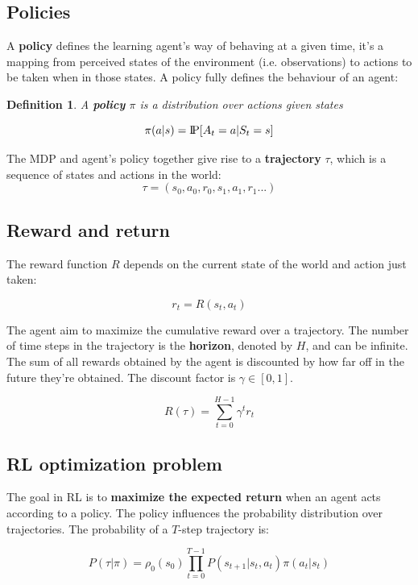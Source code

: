 \documentclass{article}
\newtheorem{definition}{Definition}
\newcommand{\Pprob}{\text{I\kern-0.15em P}}
\begin{document}
\subsection{Policies}
A \textbf{policy} defines the learning agent’s way of behaving at a given time, it's a mapping from perceived states of the environment (i.e. observations) to actions to be taken when in those states. A policy fully defines the behaviour of an agent:

\begin{definition}
	 A \textbf{policy} $\pi$ is a distribution over actions given states
	
	\begin{equation}
	\pi(a | s) = \Pprob[A_t=a|S_t=s]
	\end{equation}

\end{definition}

The MDP and agent's policy together give rise to a \textbf{trajectory} $\tau$, which is a sequence of states and actions in the world:
$$\tau = (s_0, a_0, r_0, s_1, a_1, r_1...)$$


\subsection{Reward and return}
The reward function $R$ depends on the current state of the world and action just taken:

$$r_t = R(s_t, a_t)$$

The agent aim to maximize the cumulative reward over a trajectory. The number of time steps in the trajectory is the \textbf{horizon}, denoted by $H$, and can be infinite. The sum of all rewards obtained by the agent is discounted by how far off in the future they’re obtained. The discount factor is $\gamma \in [0,1]$.

\begin{equation}
R(\tau) = \sum_{t=0}^{H-1} \gamma^t r_t
\end{equation}

\subsection{RL optimization problem}
The goal in RL is to \textbf{maximize the expected return} when an agent acts according to a policy. The policy influences the probability distribution over trajectories. The probability of a $T$-step trajectory is:

\begin{equation}
P(\tau|\pi) = \rho_0 (s_0) \prod_{t=0}^{T-1} P(s_{t+1} | s_t, a_t) \pi(a_t | s_t)
\end{equation}
\end{document}
